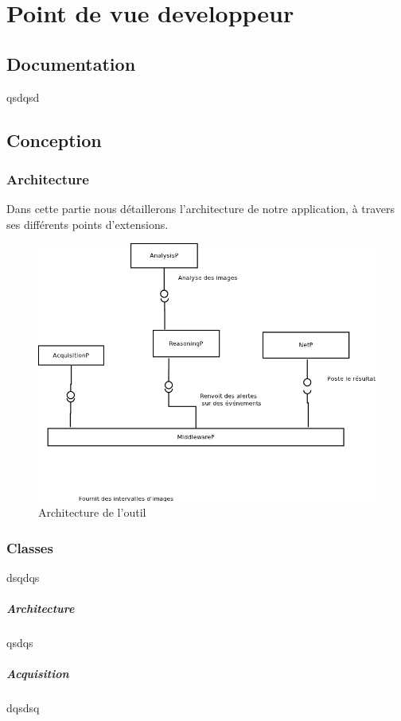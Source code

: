 \chapter{Point de vue developpeur}

\section{Documentation}
qsdqsd
\clearpage
\section{Conception}
\subsection{Architecture}
Dans cette partie nous détaillerons l'architecture de notre application, à travers ses différents points d'extensions.
\begin{figure}[!htbp]
  \centering
  \includegraphics[scale=0.50]{img/archi}
  \caption{Architecture de l'outil}
  \label{fig:archi}
\end{figure}

\subsection{Classes}
dsqdqs
\paragraph{Architecture}
qsdqs
\paragraph{Acquisition}
dqsdsq
